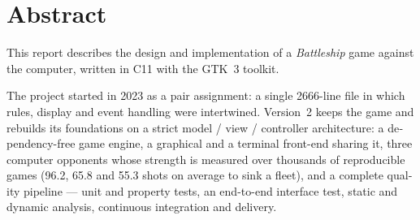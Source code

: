 \chapter*{Abstract}

\begin{otherlanguage}{english}
This report describes the design and implementation of a \emph{Battleship} game against the
computer, written in C11 with the GTK~3 toolkit.

The project started in 2023 as a pair assignment: a single \num{2666}-line file in which
rules, display and event handling were intertwined. Version~2 keeps the game and rebuilds its
foundations on a strict model / view / controller architecture: a dependency-free game engine,
a graphical and a terminal front-end sharing it, three computer opponents whose strength is
measured over thousands of reproducible games (\num{96.2}, \num{65.8} and \num{55.3} shots on
average to sink a fleet), and a complete quality pipeline --- unit and property tests, an
end-to-end interface test, static and dynamic analysis, continuous integration and delivery.
\end{otherlanguage}

